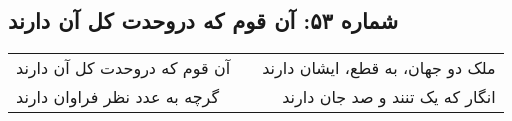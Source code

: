 \begin{center}
\section*{شماره ۵۳: آن قوم که دروحدت کل آن دارند}
\label{sec:053}
\begin{longtable}{l p{0.5cm} r}
آن قوم که دروحدت کل آن دارند
&&
ملک دو جهان، به قطع، ایشان دارند
\\
گرچه به عدد نظر فراوان دارند
&&
انگار که یک تنند و صد جان دارند
\\
\end{longtable}
\end{center}
